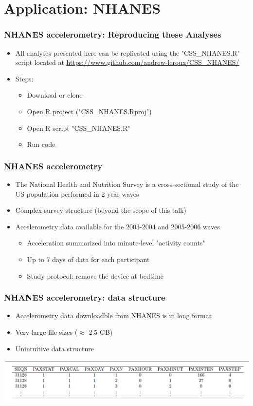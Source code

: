\documentclass[10pt]{beamer}\usepackage[]{graphicx}\usepackage[]{color}
\begin{document}
\section{Application: NHANES}

\begin{frame}
\frametitle{NHANES accelerometry: Reproducing these Analyses}
\begin{itemize}
\item All analyses presented here can be replicated using the "CSS\_NHANES.R" script located at 
\url{https://www.github.com/andrew-leroux/CSS_NHANES/}
\item Steps:
    \begin{itemize}
    \item Download or clone
    \item Open R project ("CSS\_NHANES.Rproj")
    \item Open R script "CSS\_NHANES.R"
    \item Run code
    \end{itemize}
\end{itemize}
\end{frame}




\begin{frame}
\frametitle{NHANES accelerometry}
\begin{itemize}
\item The National Health and Nutrition Survey is a cross-sectional study of the US population performed in 2-year waves
\item Complex survey structure (beyond the scope of this talk)
\item Accelerometry data available for the 2003-2004 and 2005-2006 waves
    \begin{itemize}
    \item Acceleration summarized into minute-level "activity counts"
    \item Up to 7 days of data for each participant
    \item Study protocol: remove the device at bedtime 
    \end{itemize}
\end{itemize}
\end{frame}



\begin{frame}
\frametitle{NHANES accelerometry: data structure}
\begin{itemize}
\item Accelerometry data downloadble from NHANES is in long format
\item Very large file sizes ($\approx$ 2.5 GB)
\item Unintuitive data structure
\end{itemize}
\includegraphics[width=\textwidth]{accel_data_long}
\end{frame}
\end{document}
